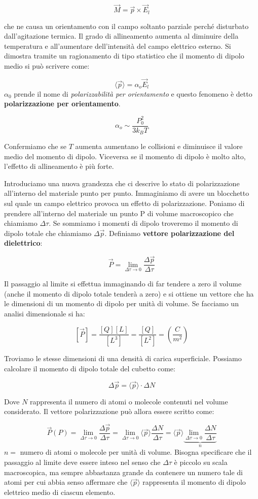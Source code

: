 \[
	\vec{M} =\vec{p} \times \vec{E}_l
\]

che ne causa un orientamento con il campo soltanto parziale perché disturbato dall'agitazione termica. Il grado di allineamento aumenta al diminuire della temperatura e all'aumentare dell'intensità del campo elettrico esterno.
Si dimostra tramite un ragionamento di tipo statistico che il momento di dipolo medio si può scrivere come:

\[
	\langle \vec{p} \rangle = \alpha_o \vec{E}_l
\]
$ \alpha_0  $ prende il nome di \emph{polarizzabilità per orientamento} e questo fenomeno è detto \textbf{polarizzazione per orientamento}.

\[
	\alpha_o \sim \frac{P_0^2}{3k_BT}
\]

Confermiamo che se $T$ aumenta aumentano le collisioni e diminuisce il valore medio del momento di dipolo. Viceversa se il momento di dipolo è molto alto, l'effetto di allineamento è più forte.

Introduciamo una nuova grandezza che ci descrive lo stato di polarizzazione all'interno del materiale punto per punto. Immaginiamo di avere un blocchetto sul quale un campo elettrico provoca un effetto di polarizzazione. Poniamo di prendere all'interno del materiale un punto P di volume macroscopico che chiamiamo $ \Delta \tau $. Se sommiamo i momenti di dipolo troveremo il momento di dipolo totale che chiamiamo $ \Delta \vec{p} $. Definiamo \textbf{vettore polarizzazione del dielettrico}:

\[
	\boxed{\vec{P} = \lim_{\Delta \tau  \to 0} \frac{\Delta \vec{p}}{\Delta \tau}}
\]

Il passaggio al limite si effettua immaginando di far tendere a zero il volume (anche il momento di dipolo totale tenderà a zero) e si ottiene un vettore che ha le dimensioni di un momento di dipolo per unità di volume. Se facciamo un analisi dimensionale si ha:

\[
	[\vec{P}] = \frac{[Q][L]}{[L^3]} = \frac{[Q]}{[L^2]} = \left( \frac{C}{m^2} \right)
\]

Troviamo le stesse dimensioni di una densità di carica superficiale. Possiamo calcolare il momento di dipolo totale del cubetto come:

\[
	\Delta \vec{p} = \langle \vec{p} \rangle \cdot \Delta N
\]

Dove $N$ rappresenta il numero di atomi o molecole contenuti nel volume considerato. Il vettore polarizzazione può allora essere scritto come:

\[
	\vec{P} (P) = \lim_{\Delta \tau  \to 0} \frac{\Delta \vec{p}}{\Delta \tau} = \lim_{\Delta \tau  \to 0} \langle \vec{p} \rangle \frac{\Delta N}{\Delta \tau} = \langle \vec{p} \rangle \underbrace{\lim_{\Delta \tau  \to 0} \frac{\Delta N}{\Delta \tau}}_n
\]
$n=$ numero di atomi o molecole per unità di volume.
Bisogna specificare che il passaggio al limite deve essere inteso nel senso che $ \Delta \tau  $ è piccolo su scala macroscopica, ma sempre abbastanza grande da contenere un numero tale di atomi per cui abbia senso affermare che $ \langle \vec{p} \rangle $ rappresenta il momento di dipolo elettrico medio di ciascun elemento.

